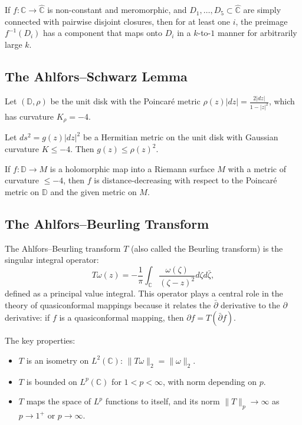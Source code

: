 \begin{theorem}
If $f: \mathbb{C} \to \widehat{\mathbb{C}}$ is non-constant and meromorphic, and $D_1,\dots,D_5 \subset \widehat{\mathbb{C}}$ are simply connected with pairwise disjoint closures, then for at least one $i$, the preimage $f^{-1}(D_i)$ has a component that maps onto $D_i$ in a $k$-to-$1$ manner for arbitrarily large $k$.
\end{theorem}

\subsection{The Ahlfors--Schwarz Lemma}

Let $(\mathbb{D}, \rho)$ be the unit disk with the Poincar{\'e} metric $\rho(z)|dz| = \frac{2|dz|}{1-|z|^2}$, which has curvature $K_\rho = -4$.

\begin{lemma}[Ahlfors]
Let $ds^2 = g(z)|dz|^2$ be a Hermitian metric on the unit disk with Gaussian curvature $K \leq -4$. Then $g(z) \leq \rho(z)^2$.
\end{lemma}

\begin{corollary}
If $f: \mathbb{D} \to M$ is a holomorphic map into a Riemann surface $M$ with a metric of curvature $\leq -4$, then $f$ is distance-decreasing with respect to the Poincar{\'e} metric on $\mathbb{D}$ and the given metric on $M$.
\end{corollary}

\subsection{The Ahlfors--Beurling Transform}

The Ahlfors--Beurling transform $T$ (also called the Beurling transform) is the singular integral operator:
\[
T\omega(z) = -\frac{1}{\pi} \int_{\mathbb{C}} \frac{\omega(\zeta)}{(\zeta - z)^2} d\zeta d\bar\zeta,
\]
defined as a principal value integral. This operator plays a central role in the theory of quasiconformal mappings because it relates the $\bar\partial$ derivative to the $\partial$ derivative: if $f$ is a quasiconformal mapping, then $\partial f = T(\bar\partial f)$.

The key properties:
\begin{itemize}
    \item $T$ is an isometry on $L^2(\mathbb{C})$: $\|T\omega\|_2 = \|\omega\|_2$.
    \item $T$ is bounded on $L^p(\mathbb{C})$ for $1 < p < \infty$, with norm depending on $p$.
    \item $T$ maps the space of $L^p$ functions to itself, and its norm $\|T\|_p \to \infty$ as $p \to 1^+$ or $p \to \infty$.
\end{itemize}

